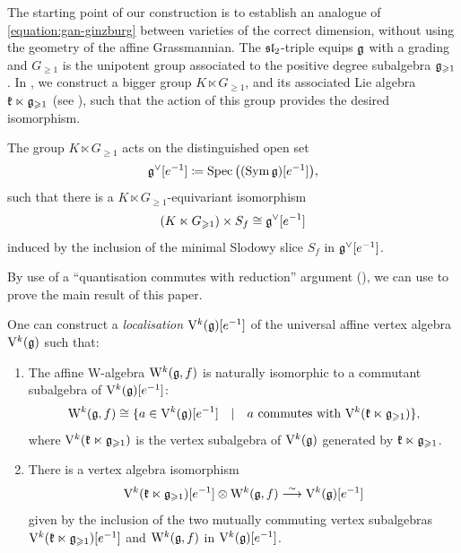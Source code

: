 The starting point of our construction is to establish an analogue of \eqref{equation:gan-ginzburg} between varieties of the correct dimension, without using the geometry of the affine Grassmannian. The $\sl_2$-triple equips $\g$ with a grading and $G_{\geqslant 1}$ is the unipotent group associated to the positive degree subalgebra $\g_{\geqslant 1}$. In , we construct a bigger group $K \ltimes G_{\geqslant 1}$, and its associated Lie algebra $\kfk \ltimes \g_{\geqslant 1}$ (see ), such that the action of this group provides the desired isomorphism.

\begin{main} \label{main:geometric-setting}
	The group $K \ltimes G_{\geqslant 1}$ acts on the distinguished open set 
	\[ \g^\vee[e^{-1}] \coloneqq \Spec \big((\Sym \g)[e^{-1}]\big), \] 
	such that there is a $K \ltimes G_{\geqslant 1}$-equivariant isomorphism
	\[ (K \ltimes G_{\geqslant 1}) \times S_f \cong \g^\vee[e^{-1}] \]
	induced by the inclusion of the minimal Slodowy slice $S_f$ in $\g^\vee[e^{-1}]$.
\end{main}

By use of a ``quantisation commutes with reduction'' argument (), we can use  to prove the main result of this paper.

\begin{main} \label{main:chiral-setting}
	One can construct a \emph{localisation} $\V^k(\g)[e^{-1}]$ of the universal affine vertex algebra $\V^k(\g)$ such that:
	\begin{enumerate}
		\item The affine W-algebra $\W^k(\g, f)$ is naturally isomorphic to a commutant subalgebra of $\V^k(\g)[e^{-1}]$:
		\[ \W^k(\g, f) \cong \{a \in \V^k(\g)[e^{-1}] \quad | \quad \text{$a$ commutes with $\V^k(\kfk \ltimes \g_{\geqslant 1})$} \}, \]
		where $\V^k(\kfk \ltimes \g_{\geqslant 1})$ is the vertex subalgebra of $\V^k(\g)$ generated by $\kfk \ltimes \g_{\geqslant 1}$.
		
		\item There is a vertex algebra isomorphism
		\begin{equation} \label{equation:main-decomposition-theorem}
			\V^k(\kfk \ltimes \g_{\geqslant 1})[e^{-1}] \otimes \W^k(\g, f) \overset{\sim}{\longrightarrow}  \V^k(\g)[e^{-1}] 
		\end{equation}
		given by the inclusion of the two mutually commuting vertex subalgebras $\V^k(\kfk \ltimes \g_{\geqslant 1})[e^{-1}]$ and $\W^k(\g, f)$ in $\V^k(\g)[e^{-1}]$.
	\end{enumerate}
\end{main}

